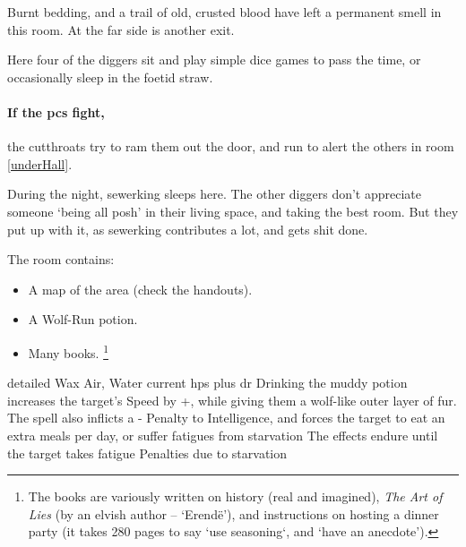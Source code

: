 \begin{boxtext}
  Burnt bedding, and a trail of old, crusted blood have left a permanent smell in this room.
  At the far side is another exit.
\end{boxtext}


Here four of the \glspl{digger} sit and play simple dice games to pass the time, or occasionally sleep in the foetid straw.

\paragraph{If the \glspl{pc} fight,}
the cutthroats try to ram them out the door, and run to alert the others in room \ref{underHall}.


\label{sewerKingRoom}

During the night, \gls{sewerking} sleeps here.
The other \glspl{digger} don't appreciate someone `being all posh' in their living space, and taking the best room.
But they put up with it, as \gls{sewerking} contributes a lot, and gets shit done.

The room contains:

\begin{itemize}
  \item
  A map of the area (check the handouts).
  \item
  A Wolf-Run potion.
  \item
  Many books.%
  \footnote{The books are variously written on history (real and imagined), \textit{The Art of Lies} (by an elvish author -- `Erend\"e'), and instructions on hosting a dinner party (it takes 280 pages to say `use seasoning`, and `have an anecdote').}
\end{itemize}

  {detailed}%
  {Wax}%
  {Air, Water}%
  {current \glspl{hp} plus \gls{dr}}%
  {Drinking the muddy potion increases the target's Speed by +, while giving them a wolf-like outer layer of fur.
  The spell also inflicts a - Penalty to Intelligence, and forces the target to eat an extra  meals per day, or suffer \glspl{fatigue} from starvation}%
  {The effects endure until the target takes \gls{fatigue} Penalties due to starvation}%

